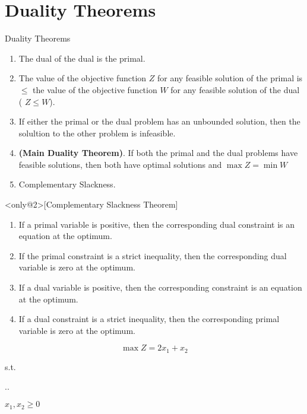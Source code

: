 
\section{Duality Theorems}
\label{sec:duality-theorems}

\begin{frame}{Duality Theorems}
  \begin{enumerate} \justifying \parskip4mm
\item<only@1> The dual of the dual is the primal.
\item<only@1> The value of the objective function $Z$ for any feasible solution of the primal is $\leq$ the value of the objective function $W$ for any feasible solution of the dual ( $Z \leq W$).
\item<only@1> If either the primal or the dual problem has an unbounded solution, then the solultion to the other problem is infeasible.
\item<only@1> \textbf{(Main Duality Theorem)}. If both the primal and the dual problems have feasible solutions, then both have optimal solutions and  $\max Z = \min W$
\item<only@1> Complementary Slackness.
\end{enumerate}

\begin{theorem}<only@2>[Complementary Slackness Theorem]
  \begin{enumerate} \justifying \parskip2mm
  \item If a \alert{primal variable is positive}, then the corresponding dual constraint is an equation at the optimum.
  \item If the \alert{primal constraint is a strict inequality}, then the corresponding dual variable
    is zero at the optimum.
    
  \item If a \alert{dual variable is positive}, then the corresponding constraint is an equation at the optimum.
  \item If a \alert{dual constraint is a strict inequality}, then the corresponding primal variable is zero at the optimum.
  \end{enumerate}
\end{theorem}
\end{frame}

\begin{frameExample}{}{}
  \[ \max Z = 2x_1 + x_2 \]
      {\centering
      s.t.%
\vspace{4mm}
      
        \sysdelim..%

      \vspace{5mm}
      $x_1, x_2 \geq 0$
      \par}
\end{frameExample}


